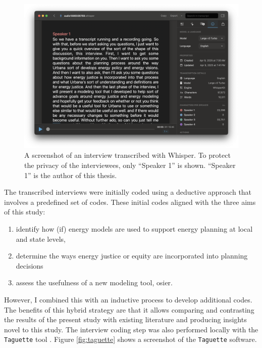 \begin{figure}[htbp!]
    \centering
    \includegraphics[width=0.8\columnwidth]{figures/07_interview_chapter/whisper-screenshot.png}
    \caption{A screenshot of an interview transcribed with Whisper. To protect
    the privacy of the interviewees, only ``Speaker 1'' is shown. ``Speaker 1''
    is the author of this thesis.}
    \label{fig:whisper}
\end{figure}

The transcribed interviews were initially coded using a deductive approach that
involves a predefined set of codes. These initial codes aligned with the three
aims of this study:
\begin{enumerate}
    \item identify how (if) energy models are used to support energy planning at
    local and state levels,
    \item determine the ways energy justice or equity are incorporated into
    planning decisions
    \item assess the usefulness of a new modeling tool, \ac{osier}.
\end{enumerate} 
However, I combined this with an inductive process to develop additional codes.
The benefits of this hybrid strategy are that it allows comparing and
contrasting the results of the present study with existing literature and
producing insights novel to this study. The interview coding step was also
performed locally with the \texttt{Taguette} tool \cite{rampin_taguette_2021}.
Figure \ref{fig:taguette} shows a screenshot of the \texttt{Taguette} software.


